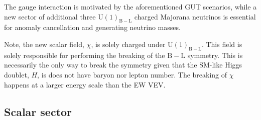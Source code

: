 { \color{gray} The gauge interaction is motivated by the aforementioned GUT scenarios, while a new sector of additional three $\mathrm{U(1)_{B-L}}$ charged Majorana neutrinos is essential for anomaly cancellation and generating neutrino masses.

Note, the new scalar field, $\chi$, is solely charged under $\mathrm{U(1)_{B-L}}$. This field is solely responsible for performing the breaking of the $\mathrm{B-L}$ symmetry. This is necessarily the only way to break the symmetry given that the SM-like Higgs doublet, $H$, is does not have baryon nor lepton number. The breaking of $\chi$ happens at a larger energy scale than the EW VEV. }


\subsection{Scalar sector}

